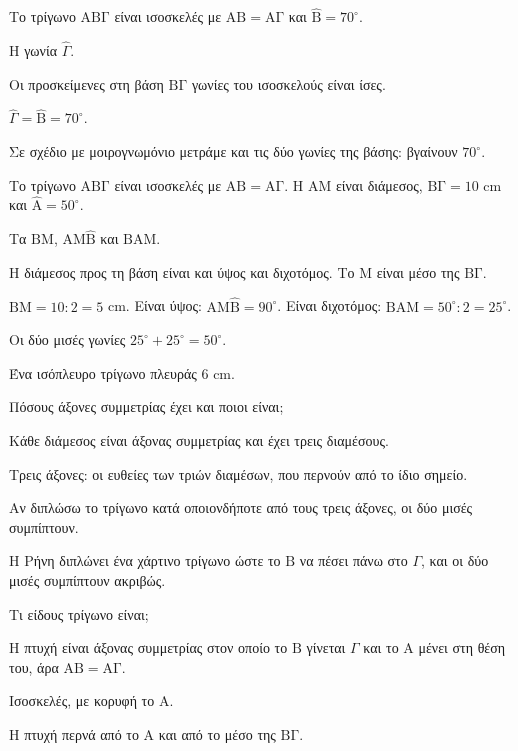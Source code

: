 
\tixero Το τρίγωνο $\mathrm{ΑΒΓ}$ είναι ισοσκελές με $\mathrm{ΑΒ}=\mathrm{ΑΓ}$ και $\hat{\mathrm{Β}}=70^\circ$.\par
\tithelo Η γωνία $\hat{\Gamma}$.\par
\possindeo Οι προσκείμενες στη βάση $\mathrm{ΒΓ}$ γωνίες του ισοσκελούς είναι ίσες.\par
\apantisi $\hat{\Gamma}=\hat{\mathrm{Β}}=70^\circ$.\par
\elegxos Σε σχέδιο με μοιρογνωμόνιο μετράμε και τις δύο γωνίες της βάσης: βγαίνουν $70^\circ$.

\tixero Το τρίγωνο $\mathrm{ΑΒΓ}$ είναι ισοσκελές με $\mathrm{ΑΒ}=\mathrm{ΑΓ}$. Η $\mathrm{ΑΜ}$ είναι διάμεσος, $\mathrm{ΒΓ}=10$ cm και $\hat{\mathrm{Α}}=50^\circ$.\par
\tithelo Τα $\mathrm{ΒΜ}$, $\mathrm{ΑΜ}\hat{\mathrm{Β}}$ και $\mathrm{ΒΑΜ}$.\par
\possindeo Η διάμεσος προς τη βάση είναι και ύψος και διχοτόμος. Το $\mathrm{Μ}$ είναι μέσο της $\mathrm{ΒΓ}$.\par
\apantisi $\mathrm{ΒΜ}=10:2=5$ cm. Είναι ύψος: $\mathrm{ΑΜ}\hat{\mathrm{Β}}=90^\circ$. Είναι διχοτόμος: $\mathrm{ΒΑΜ}=50^\circ:2=25^\circ$.\par
\elegxos Οι δύο μισές γωνίες $25^\circ+25^\circ=50^\circ$.

\tixero Ένα ισόπλευρο τρίγωνο πλευράς $6$ cm.\par
\tithelo Πόσους άξονες συμμετρίας έχει και ποιοι είναι;\par
\possindeo Κάθε διάμεσος είναι άξονας συμμετρίας και έχει τρεις διαμέσους.\par
\apantisi Τρεις άξονες: οι ευθείες των τριών διαμέσων, που περνούν από το ίδιο σημείο.\par
\elegxos Αν διπλώσω το τρίγωνο κατά οποιονδήποτε από τους τρεις άξονες, οι δύο μισές συμπίπτουν.

\tixero Η Ρήνη διπλώνει ένα χάρτινο τρίγωνο ώστε το $\mathrm{Β}$ να πέσει πάνω στο $\Gamma$, και οι δύο μισές συμπίπτουν ακριβώς.\par
\tithelo Τι είδους τρίγωνο είναι;\par
\possindeo Η πτυχή είναι άξονας συμμετρίας στον οποίο το $\mathrm{Β}$ γίνεται $\Gamma$ και το $\mathrm{Α}$ μένει στη θέση του, άρα $\mathrm{ΑΒ}=\mathrm{ΑΓ}$.\par
\apantisi Ισοσκελές, με κορυφή το $\mathrm{Α}$.\par
\elegxos Η πτυχή περνά από το $\mathrm{Α}$ και από το μέσο της $\mathrm{ΒΓ}$.

